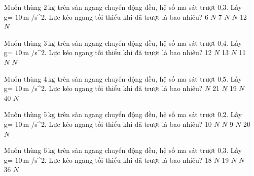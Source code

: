 \begin{ex}
Muốn thùng $2\,\text{kg}$ trên sàn ngang chuyển động đều, hệ số ma sát trượt 0,3. Lấy g= $10\,\text{m}$ /s^2. Lực kéo ngang tối thiểu khi đã trượt là bao nhiêu?
\choice
{6 $N$}
{7 $N$}
{ $N$}
{12 $N$}
\end{ex}

\begin{ex}
Muốn thùng $3\,\text{kg}$ trên sàn ngang chuyển động đều, hệ số ma sát trượt 0,4. Lấy g= $10\,\text{m}$ /s^2. Lực kéo ngang tối thiểu khi đã trượt là bao nhiêu?
\choice
{12 $N$}
{13 $N$}
{11 $N$}
{ $N$}
\end{ex}

\begin{ex}
Muốn thùng $4\,\text{kg}$ trên sàn ngang chuyển động đều, hệ số ma sát trượt 0,5. Lấy g= $10\,\text{m}$ /s^2. Lực kéo ngang tối thiểu khi đã trượt là bao nhiêu?
\choice
{ $N$}
{21 $N$}
{19 $N$}
{40 $N$}
\end{ex}

\begin{ex}
Muốn thùng $5\,\text{kg}$ trên sàn ngang chuyển động đều, hệ số ma sát trượt 0,2. Lấy g= $10\,\text{m}$ /s^2. Lực kéo ngang tối thiểu khi đã trượt là bao nhiêu?
\choice
{10 $N$}
{ $N$}
{9 $N$}
{20 $N$}
\end{ex}

\begin{ex}
Muốn thùng $6\,\text{kg}$ trên sàn ngang chuyển động đều, hệ số ma sát trượt 0,3. Lấy g= $10\,\text{m}$ /s^2. Lực kéo ngang tối thiểu khi đã trượt là bao nhiêu?
\choice
{18 $N$}
{19 $N$}
{ $N$}
{36 $N$}
\end{ex}

